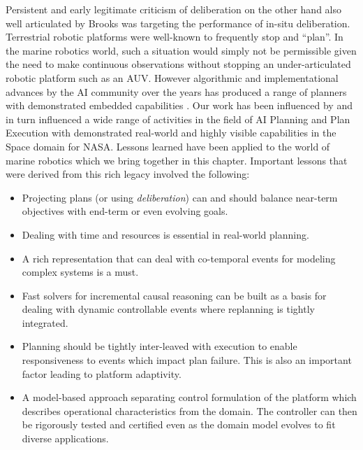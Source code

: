Persistent and early legitimate criticism of deliberation on the other
hand also well articulated by Brooks
\cite{Brooks91intelligencewithoutrea,Brooks91intelligencewithoutrep}
was targeting the performance of in-situ deliberation. Terrestrial
robotic platforms were well-known to frequently stop and ``plan''. In
the marine robotics world, such a situation would simply not be
permissible given the need to make continuous observations without
stopping an under-articulated robotic platform such as an AUV. However
algorithmic and implementational advances by the AI community over the
years has produced a range of planners with demonstrated embedded
capabilities . Our work has been influenced by and in
turn influenced a wide range of activities in the field of AI Planning
and Plan Execution with demonstrated real-world and highly visible
capabilities in the Space domain \cite{mus98, rajan00, ai-chang04,
  bresina05} for NASA. Lessons learned have been applied to the world
of marine robotics which we bring together in this chapter. Important
lessons that were derived from this rich legacy involved the following:

\begin{itemize}

\item Projecting plans (or using \emph{deliberation}) can and should
  balance near-term objectives with end-term or even evolving goals.

\item Dealing with time and resources is essential in real-world
  planning.

\item A rich representation that can deal with co-temporal events for
  modeling complex systems is a must.

\item Fast solvers for incremental causal reasoning can be built as a
  basis for dealing with dynamic controllable events where replanning
  is tightly integrated.

\item Planning should be tightly inter-leaved with execution to enable
  responsiveness to events which impact plan failure. This is also an
  important factor leading to platform adaptivity.

\item A model-based approach separating control formulation of the
  platform which describes operational characteristics from the
  domain. The controller can then be rigorously tested and certified
  even as the domain model evolves to fit diverse applications.

\end{itemize}

